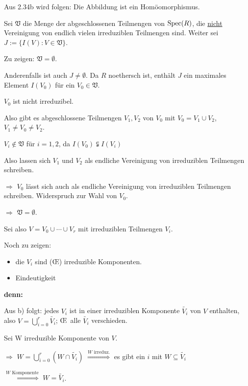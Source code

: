\documentclass[a4paper, 10pt]{report}
\begin{document}
\begin{DefProp}
\begin{Bew}
\begin{enumerate}
Aus 2.34b wird folgen: Die Abbildung ist ein Hom\"oomorphismus.

Sei $\mathfrak{V}$ die Menge der abgeschlossenen Teilmengen von $\mathrm{Spec}(R)$, die
\underline{nicht} Vereinigung von endlich vielen irreduziblen Teilmengen sind.
Weiter sei $J := \{ I(V) : V \in \mathfrak{V} \}$.

Zu zeigen: $\mathfrak{V} = \emptyset$.

Anderenfalls ist auch $J \neq \emptyset$. Da $R$ noethersch ist, enth\"alt $J$ ein maximales Element $I(V_0)$ f\"ur ein $V_0 \in \mathfrak{V}$.

$V_0$ ist nicht irreduzibel.

Also gibt es abgeschlossene Teilmengen $V_1, V_2$ von $V_0$ mit $V_0 = V_1 \cup V_2$, $V_1 \neq V_0 \neq V_2$.

$V_i \notin \mathfrak{V}$ f\"ur $i = 1,2$, da $I(V_0) \subsetneqq I(V_i)$

Also lassen sich $V_1$ und $V_2$ als endliche Vereinigung von irreduziblen Teilmengen schreiben.

$\Rightarrow$ $V_0$ l\"asst sich auch als endliche Vereinigung von irreduziblen Teilmengen schreiben. Widerspruch zur Wahl von $V_0$.

$\Rightarrow$ $\mathfrak{V} = \emptyset$.
\bigskip

Sei also $V = V_0 \cup \cdots \cup V_r$ mit irreduziblen Teilmengen $V_i$.

Noch zu zeigen: 
\begin{itemize}
\item die $V_i$ sind (\OE) irreduzible Komponenten.
\item Eindeutigkeit
\end{itemize}

\textbf{denn:}

Aus b) folgt: jedes $V_i$ ist in einer irreduziblen Komponente
$\widetilde{V_i}$ von $V$ enthalten, also $V = \bigcup_{i=0}^r
\widetilde{V_i}$; \OE\ alle $\widetilde{V_i}$ verschieden.

Sei W irreduzible Komponente von $V$.

$\Rightarrow$ $W = \bigcup_{i=0}^r (W \cap \widetilde{V_i})$ $\overset{W \text{ irreduz.}}\Rightarrow$ es gibt ein $i$ mit $W \subseteq \widetilde{V_i}$

$\overset{W \text{ Komponente}}\Rightarrow$ $W = \widetilde{V_i}$.

\end{enumerate}
\end{Bew}

\end{DefProp}
\end{document}
